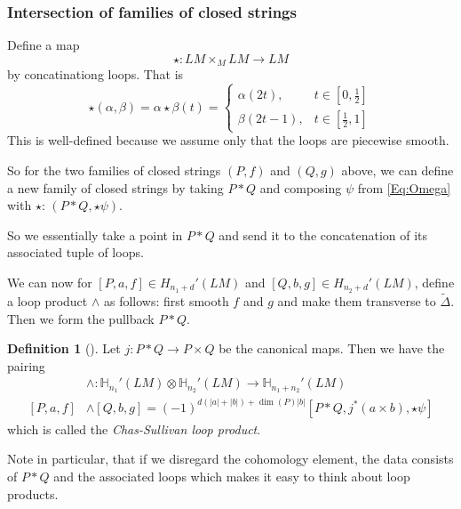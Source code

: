 \documentclass[reqno]{amsart}
\theoremstyle{definition}
\newtheorem{definition}[theorem]{Definition}
\theoremstyle{remark}
\begin{document}
\subsubsection{Intersection of families of closed strings}

Define a map
\[
\star \colon LM \times_M LM \to LM   
\] 
by concatinationg loops. That is
\[
\star \left( \alpha, \beta \right) = 
\alpha \star \beta (t) = 
\begin{cases}
    \alpha(2t),& t \in \left[ 0,\frac{1}{2} \right] \\
    \beta (2t-1), & t \in \left[ \frac{1}{2},1 \right] 
\end{cases}
\] 
This is well-defined because we assume only that the loops
are piecewise smooth.

So for the two families of closed strings
$(P,f)$ and $(Q,g)$ above, we can define a new
family of closed strings by taking $P*Q$ and composing
$\psi $ from \eqref{Eq:Omega} with $\star$:
 $\left( P * Q, \star \psi  \right) $.

 So we essentially take a point in $P * Q$ and send it to
 the concatenation of its associated tuple of loops.







We can now for 
$\left[ P,a,f \right] \in H_{n_1+d}' (LM)$ and
$\left[ Q,b,g \right] \in H_{n_2+d}'(LM)$, define a 
loop product $\wedge$ as follows:
first smooth $f$ and $g$ and make them transverse to
$\tilde{\Delta}$. Then
we form the pullback
$P * Q$.

\begin{definition}[]\cite[Definition 4.2.1]{Chataur}
    Let $j \colon P * Q \to P \times Q$ be the canonical maps.
    Then we have the pairing
    \begin{align*}
        &\wedge \colon \mathbb{H}_{n_1}'(LM) \otimes
        \mathbb{H}_{n_2}'(LM) \to \mathbb{H}_{n_1+n_2}'(LM)\\
        \left[ P,a,f \right] 
        &\wedge
        \left[ Q,b,g \right] = 
        (-1)^{d \left( \left| a \right| + \left| b \right|  \right) 
        + \dim (P) \left| b \right| }
        \left[ P* Q , j^{*} (a \times b) , 
        \star \psi  \right] 
    \end{align*}
    which is called the \textit{Chas-Sullivan loop product}.
\end{definition}

Note in particular, that if we disregard the
cohomology element, the data consists 
of $P * Q$ and the associated loops which makes it easy to think
about loop products.
\end{document}
